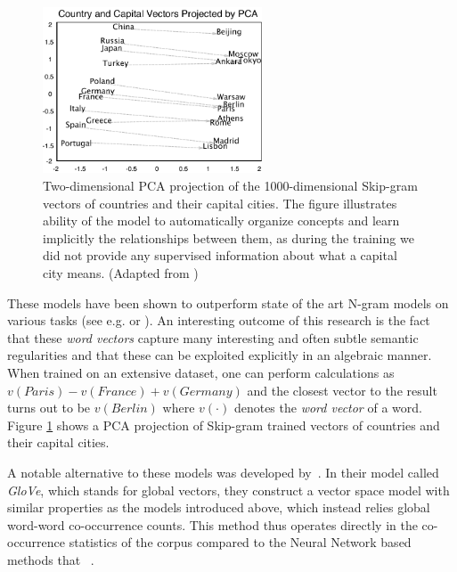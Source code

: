 \begin{figure}
  \begin{center}
    \includegraphics[width=0.58\textwidth]{img/word2vec_cities.pdf}
  \end{center}
  \caption{Two-dimensional PCA projection of the 1000-dimensional Skip-gram vectors of countries and their capital cities. The figure illustrates ability of the model to automatically organize concepts and learn implicitly the relationships between them, as during the training we did not provide any supervised information about what a capital city means. (Adapted from \cite{Mikolov:2013ac})}
  \label{fig:word2vec-cities}
\end{figure}

These models have been shown to outperform state of the art N-gram models on various tasks (see e.g. \cite{bengio2003neural} or \cite{Mikolov:2012aa}). An interesting outcome of this research is the fact that these \emph{word vectors} capture many interesting and often subtle semantic regularities and that these can be exploited explicitly in an algebraic manner. When trained on an extensive dataset, one can perform calculations as $v(Paris) - v(France) + v(Germany)$ and the closest vector to the result turns out to be $v(Berlin)$ where $v(\cdot)$ denotes the \emph{word vector} of a word. Figure \ref{fig:word2vec-cities} shows a PCA projection of Skip-gram trained vectors of countries and their capital cities.

A notable alternative to these models was developed by~\cite{Pennington:2014aa}. In their model called \emph{GloVe}, which stands for global vectors, they construct a vector space model with similar properties as the models introduced above, which instead relies global word-word co-occurrence counts. This method thus operates directly in the co-occurrence statistics of the corpus compared to the Neural Network based methods that ~\cite{Pennington:2014aa}.

